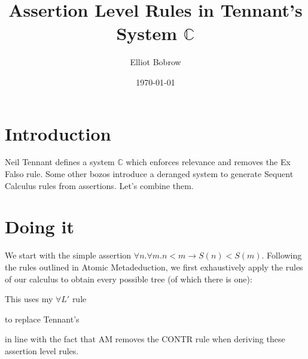 \documentclass[12pt]{article}
\title{Assertion Level Rules in Tennant's System $\mathbb{C}$}
\author{Elliot Bobrow}
\date{\today}
\begin{document}
\maketitle

\tableofcontents

\section{Introduction}

Neil Tennant defines a system $\mathbb{C}$ which enforces relevance and removes
the Ex Falso rule. Some other bozos introduce a deranged system to generate
Sequent Calculus rules from assertions. Let's combine them.

\section{Doing it}

We start with the simple assertion $\forall n.\forall m.n<m\rightarrow
S(n)<S(m)$. Following the rules outlined in Atomic Metadeduction, we first
exhaustively apply the rules of our calculus to obtain every possible tree (of
which there is one):
\begin{prooftree}
\end{prooftree}

This uses my $\forall L'$ rule
\begin{prooftree}
\end{prooftree}
to replace Tennant's
\begin{prooftree}
\end{prooftree}
in line with the fact that AM removes the CONTR rule when deriving these
assertion level rules.
\end{document}
